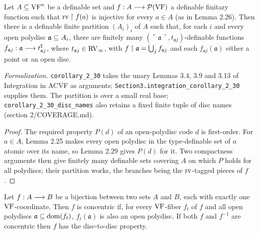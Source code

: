 \setcounter{theorem}{29}
\begin{corollary}
\label{part-rv-cons}
\leanok
{}
Let $A \subseteq \mathrm{VF}^n$ be a definable set and $f : A \longrightarrow \mathcal{P}(\mathrm{VF})$ a definable finitary function such that $\operatorname{rv} \upharpoonright f(a)$ is injective for every $a \in A$ (as in Lemma 2.26). Then there is a definable finite partition $(A_i)_i$ of $A$ such that, for each $i$ and every open polydisc $\mathfrak{a} \subseteq A_i$, there are finitely many $(\ulcorner \mathfrak{a} \urcorner, t_{\mathfrak{a} j})$-definable functions $f_{\mathfrak{a} j} : \mathfrak{a} \longrightarrow t^\sharp_{\mathfrak{a} j}$, where $t_{\mathfrak{a} j} \in \mathrm{RV}_\infty$, with $f \upharpoonright \mathfrak{a} = \bigcup_j f_{\mathfrak{a} j}$ and each $f_{\mathfrak{a} j}(\mathfrak{a})$ either a point or an open disc.

\emph{Formalization.} \texttt{corollary\_2\_30} takes the unary Lemmas 3.4, 3.9 and 3.13 of Integration in ACVF as arguments; \texttt{Section3.integration\_corollary\_2\_30} supplies them. The partition is over a small real base; \texttt{corollary\_2\_30\_disc\_names} also retains a fixed finite tuple of disc names (section 2/COVERAGE.md).
\end{corollary}

\begin{proof}
\leanok
The required property $P(d)$ of an open-polydisc code $d$ is first-order. For $a \in A$, Lemma 2.25 makes every open polydisc in the type-definable set of $a$ atomic over its name, so Lemma 2.29 gives $P(d)$ for it. Two compactness arguments then give finitely many definable sets covering $A$ on which $P$ holds for all polydiscs; their partition works, the branches being the $\operatorname{rv}$-tagged pieces of $f$.
\end{proof}

\setcounter{theorem}{30}
\begin{definition}
\label{defn-dtdp}
\leanok
{}
Let $f : A \longrightarrow B$ be a bijection between two sets $A$ and $B$, each with exactly one $\mathrm{VF}$-coordinate. Then $f$ is concentric if, for every $\mathrm{VF}$-fiber $f_t$ of $f$ and all open polydiscs $\mathfrak{a} \subseteq \operatorname{dom}(f_t)$, $f_t(\mathfrak{a})$ is also an open polydisc. If both $f$ and $f^{-1}$ are concentric then $f$ has the disc-to-disc property.
\end{definition}

